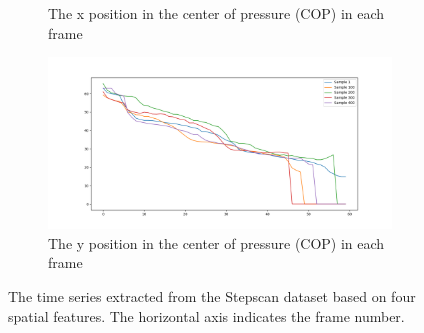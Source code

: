 \begin{figure}
\begin{subfigure}[b]{0.5\textwidth}
         \caption{The x position in the center of pressure (COP) in each frame}
         \label{fig:extracted_features_xCe}
     \end{subfigure}
     \hfill
     \begin{subfigure}[b]{0.5\textwidth}
         \centering
         \includegraphics[width=\textwidth]{manuscript/src/figures/project/df_yCe.png}
         \caption{The y position in the center of pressure (COP) in each frame}
         \label{fig:extracted_features_yCe}
     \end{subfigure} 
        \caption{The time series extracted from the Stepscan dataset based on four spatial features. The horizontal axis indicates the frame number.}
        \label{fig:extracted_features}
\end{figure}




